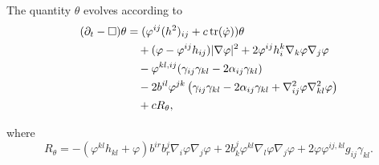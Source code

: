 \documentclass{amsart}
\begin{document}
\begin{lemma}
\label{lem:Evtheta}
The quantity $\theta$ evolves according to
\[
\begin{split}
(\partial_{t} - \Box)\theta &= (\varphi^{ij}(h^2)_{ij} + c\operatorname{tr}(\dot{\varphi}))\theta \\
&\quad + (\varphi - \varphi^{ij}h_{ij})|\nabla\varphi|^{2} + 2\varphi^{ij}h^{k}_{i}\nabla_k\varphi\nabla_j\varphi \\
&\quad - \varphi^{kl,ij} (\gamma_{ij}\gamma_{kl}  - 2\alpha_{ij} \gamma_{kl}) \\
&\quad - 2b^{il} \varphi^{jk} \left(\gamma_{ij} \gamma_{kl} - 2\alpha_{ij} \gamma_{kl} + \nabla^2_{ij}\varphi\nabla^2_{kl}\varphi\right) \\
&\quad + cR_{\theta},
\end{split}
\]
\end{lemma}
where
\[
R_{\theta} = -(\varphi^{kl}h_{kl} + \varphi)b^{ir}b^{j}_{r}\nabla_i \varphi\nabla_j\varphi + 2 b^{j}_{k}\varphi^{kl}\nabla_l\varphi\nabla_j\varphi + 2 \varphi\varphi^{ij,kl} g_{ij} \gamma_{kl}.
\]
\end{document}
